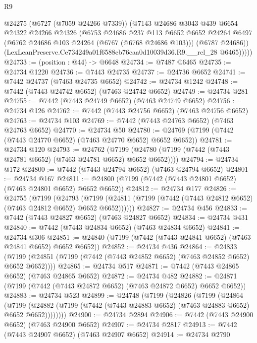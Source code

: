 \begin{lexlean}{R9}
\begin{coremodule}
          @24275
          (@6727 (@7059 @24266 @7339))
          (@7143
            @24686
            @3043
            @439
            @6654
            @24322
            @24266
            @24326
            (@6753
              @24686
              @237
              @113
              @6652
              @6652
              @24264
              @6497
              (@6762 @24686 @103 @24264 (@6767 (@6768 @24686 @103)))
              (@6787 @24686))
            (LexLeanPreserve.Ce734249a01f6588cb76caa0d10039d36.R9.__rel_28 @6465)))))
@24733 := (position : @44) -> @6648
@24734 := @7487 @6465
@24735 := @24734 @1220
@24736 := @7443 @24735
@24737 := @24736 @6652
@24741 := @7442 @24737 (@7463 @24735 @6652)
@24742 := @24734 @1242
@24748 := @7442 (@7443 @24742 @6652) (@7463 @24742 @6652)
@24749 := @24734 @281
@24755 := @7442 (@7443 @24749 @6652) (@7463 @24749 @6652)
@24756 := @24734 @126
@24762 := @7442 (@7443 @24756 @6652) (@7463 @24756 @6652)
@24763 := @24734 @103
@24769 := @7442 (@7443 @24763 @6652) (@7463 @24763 @6652)
@24770 := @24734 @50
@24780 := @24769 (@7199 (@7442 (@7443 @24770 @6652) (@7463 @24770 @6652) @6652 @6652))
@24781 := @24734 @120
@24793 := @24762
    (@7199 (@24780 (@7199 (@7442 (@7443 @24781 @6652) (@7463 @24781 @6652) @6652 @6652))))
@24794 := @24734 @172
@24800 := @7442 (@7443 @24794 @6652) (@7463 @24794 @6652)
@24801 := @24734 @167
@24811 := @24800 (@7199 (@7442 (@7443 @24801 @6652) (@7463 @24801 @6652) @6652 @6652))
@24812 := @24734 @177
@24826 := @24755
    (@7199
      (@24793
        (@7199 (@24811 (@7199 (@7442 (@7443 @24812 @6652) (@7463 @24812 @6652) @6652 @6652))))))
@24827 := @24734 @456
@24833 := @7442 (@7443 @24827 @6652) (@7463 @24827 @6652)
@24834 := @24734 @431
@24840 := @7442 (@7443 @24834 @6652) (@7463 @24834 @6652)
@24841 := @24734 @306
@24851 := @24840 (@7199 (@7442 (@7443 @24841 @6652) (@7463 @24841 @6652) @6652 @6652))
@24852 := @24734 @436
@24864 := @24833
    (@7199 (@24851 (@7199 (@7442 (@7443 @24852 @6652) (@7463 @24852 @6652) @6652 @6652))))
@24865 := @24734 @517
@24871 := @7442 (@7443 @24865 @6652) (@7463 @24865 @6652)
@24872 := @24734 @482
@24882 := @24871 (@7199 (@7442 (@7443 @24872 @6652) (@7463 @24872 @6652) @6652 @6652))
@24883 := @24734 @523
@24899 := @24748
    (@7199
      (@24826
        (@7199
          (@24864
            (@7199
              (@24882 (@7199 (@7442 (@7443 @24883 @6652) (@7463 @24883 @6652) @6652 @6652))))))))
@24900 := @24734 @2894
@24906 := @7442 (@7443 @24900 @6652) (@7463 @24900 @6652)
@24907 := @24734 @2817
@24913 := @7442 (@7443 @24907 @6652) (@7463 @24907 @6652)
@24914 := @24734 @2790

\end{coremodule}
\end{lexlean}
